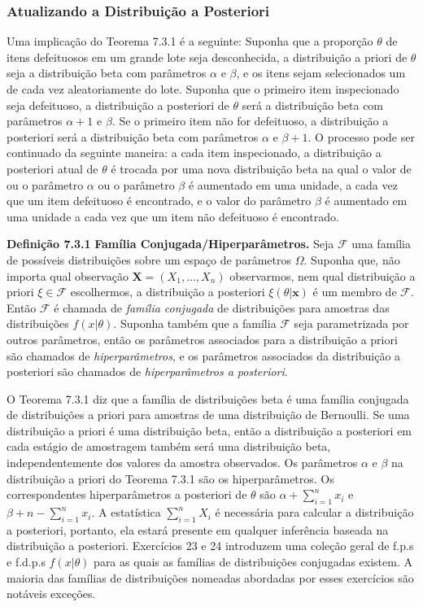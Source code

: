 \subsubsection*{Atualizando a Distribuição a Posteriori}
Uma implicação do Teorema 7.3.1 é a seguinte: Suponha que a proporção $\theta$ de itens defeituosos em um grande lote seja desconhecida, a distribuição a priori de $\theta$ seja a distribuição beta com parâmetros $\alpha$ e $\beta$, e os itens sejam selecionados um de cada vez aleatoriamente do lote. Suponha que o primeiro item inspecionado seja defeituoso, a distribuição a posteriori de $\theta$ será a distribuição beta com parâmetros $\alpha+1$ e $\beta$. Se o primeiro item não for defeituoso, a distribuição a posteriori será a distribuição beta com parâmetros $\alpha$ e $\beta+1$. O processo pode ser continuado da seguinte maneira: a cada item inspecionado, a distribuição a posteriori atual de $\theta$ é trocada por uma nova distribuição beta na qual o valor de ou o parâmetro $\alpha$ ou o parâmetro $\beta$ é aumentado em uma unidade, a cada vez que um item defeituoso é encontrado, e o valor do parâmetro $\beta$ é aumentado em uma unidade a cada vez que um item não defeituoso é encontrado.

\vspace{1cm}
\noindent\textbf{Definição 7.3.1} \quad \textbf{Família Conjugada/Hiperparâmetros.} Seja $\mathcal{F}$ uma família de possíveis distribuições sobre um espaço de parâmetros $\Omega$. Suponha que, não importa qual observação $\mathbf{X}=(X_1, \dots, X_n)$ observarmos, nem qual distribuição a priori $\xi \in \mathcal{F}$ escolhermos, a distribuição a posteriori $\xi(\theta|\mathbf{x})$ é um membro de $\mathcal{F}$. Então $\mathcal{F}$ é chamada de \textit{família conjugada} de distribuições para amostras das distribuições $f(x|\theta)$. Suponha também que a família $\mathcal{F}$ seja parametrizada por outros parâmetros, então os parâmetros associados para a distribuição a priori são chamados de \textit{hiperparâmetros}, e os parâmetros associados da distribuição a posteriori são chamados de \textit{hiperparâmetros a posteriori}.

\vspace{1cm}
O Teorema 7.3.1 diz que a família de distribuições beta é uma família conjugada de distribuições a priori para amostras de uma distribuição de Bernoulli. Se uma distribuição a priori é uma distribuição beta, então a distribuição a posteriori em cada estágio de amostragem também será uma distribuição beta, independentemente dos valores da amostra observados. Os parâmetros $\alpha$ e $\beta$ na distribuição a priori do Teorema 7.3.1 são os hiperparâmetros. Os correspondentes hiperparâmetros a posteriori de $\theta$ são $\alpha + \sum_{i=1}^{n}x_i$ e $\beta+n-\sum_{i=1}^{n}x_i$. A estatística $\sum_{i=1}^{n}X_i$ é necessária para calcular a distribuição a posteriori, portanto, ela estará presente em qualquer inferência baseada na distribuição a posteriori. Exercícios 23 e 24 introduzem uma coleção geral de f.p.s e f.d.p.s $f(x|\theta)$ para as quais as famílias de distribuições conjugadas existem. A maioria das famílias de distribuições nomeadas abordadas por esses exercícios são notáveis exceções.

